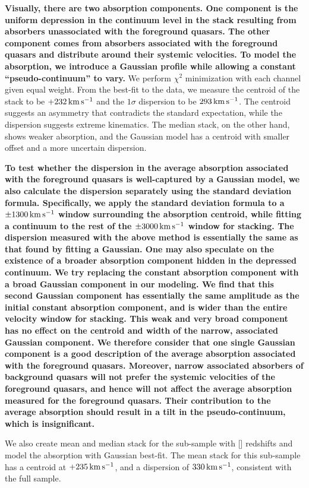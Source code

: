\documentclass[iop]{emulateapj}
\begin{document}
{\bf Visually, there are two absorption components. One component is the uniform depression in the
continuum level in the stack resulting from absorbers unassociated with the foreground
quasars. The other component comes from absorbers associated with the foreground quasars and
distribute around their systemic velocities. To model the absorption, we introduce
a Gaussian profile while allowing a constant ``pseudo-continuum'' to vary.}
We perform $\chi^2$ minimization with each channel given equal weight. From the best-fit
to the data, we measure the centroid of the  stack to be $+232\,{\rm km\,s^{-1}}$ and
the $1\sigma$ dispersion to be $293\,{\rm km\,s^{-1}}$. The centroid suggests an asymmetry that
contradicts the standard expectation, while the dispersion suggests extreme kinematics. The median
stack, on the other hand, shows weaker absorption, and the Gaussian model has a centroid with
smaller offset and a more uncertain dispersion.

{\bf To test whether the dispersion in the average absorption associated with the foreground quasars is
well-captured by a Gaussian model, we also calculate the dispersion separately using the standard
deviation formula. Specifically, we apply the standard deviation formula to a $\pm1300\,{\rm km\,s^{-1}}$
window surrounding the absorption centroid, while fitting a continuum to the rest of the
$\pm3000\,{\rm km\,s^{-1}}$ window for stacking. The
dispersion measured with the above method is essentially the same as that found by fitting a Gaussian.
One may also speculate on the existence of a broader absorption component hidden in the depressed
continuum. We try replacing the constant absorption component with a broad Gaussian component in our
modeling. We find that this second Gaussian component has essentially the same amplitude as the initial
constant absorption component, and is wider than the entire velocity window for stacking.
This weak and very broad component has no effect on the centroid and width of the narrow,
associated Gaussian component. We therefore consider that one single Gaussian component is a good
description of the average absorption associated with the foreground quasars.
Moreover, narrow associated absorbers of background quasars will not prefer the systemic velocities of
the foreground quasars, and hence will not affect the average absorption measured for the foreground
quasars. Their contribution to the average absorption should result in a tilt in the
pseudo-continuum, which is insignificant.}

We also create mean and median stack for the sub-sample with [] redshifts and model the
absorption with Gaussian best-fit. The  mean stack for this sub-sample has a centroid at
$+235\,{\rm km\,s^{-1}}$, and a dispersion of $330\,{\rm km\,s^{-1}}$, consistent with the full
sample.
\end{document}
